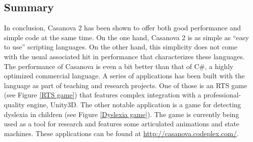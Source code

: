 \subsection{Summary}
In conclusion, Casanova 2 has been shown to offer both good performance and simple code at the same time. On the one hand, Casanova 2 is as simple as ``easy to use''  scripting languages. On the other hand, this simplicity does not come with the usual associated hit in performance that characterizes these languages. The performance of Casanova is even a bit better than that of C\#, a highly optimized commercial language. A series of applications has been built with the language as part of teaching and research projects.  One of those is an RTS game (see Figure \ref{RTS game}) that features complex integration with a professional-quality engine, Unity3D\cite{Unity3D}. The other notable application is a game for detecting dyslexia in children (see Figure \ref{Dyslexia game}). The game is currently being used as a tool for research and features some articulated animations and state machines. These applications can be found at \url{http://casanova.codeplex.com/}.

